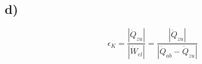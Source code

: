 

\subsection*{d)}

\[
\epsilon_K = \frac{|\dot{Q}_{zu}|}{|\dot{W}_{el}|} = \frac{|\dot{Q}_{zu}|}{|\dot{Q}_{ab} - \dot{Q}_{zu}|}
\]
